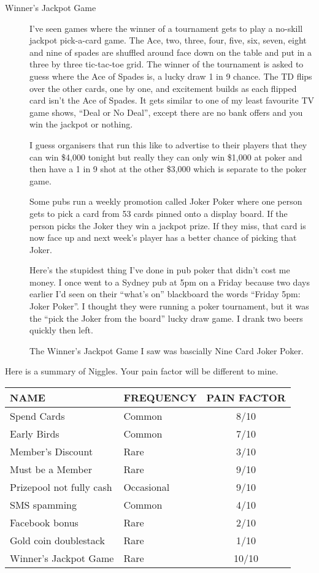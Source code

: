 \begin{description}
\item[Winner's Jackpot Game] I've seen games where the winner of a
tournament gets to play a no-skill jackpot pick-a-card game. The Ace, two,
three, four, five, six, seven, eight and nine of spades are shuffled
around face down on the table and put in a three by three tic-tac-toe
grid. The winner of the tournament is asked to guess where the Ace of
Spades is, a lucky draw 1 in 9 chance. The TD flips over the other
cards, one by one, and excitement builds as each flipped card isn't
the Ace of Spades. It gets similar to one of my least favourite TV
game shows, ``Deal or No Deal'', except there are no bank offers and you
win the jackpot or nothing.

I guess organisers that run this like to advertise to their players that
they can win \$4,000 tonight but really they can only win \$1,000 at
poker and then have a 1 in 9 shot at the other \$3,000 which is
separate to the poker game.

Some pubs run a weekly promotion called Joker Poker where one person
gets to pick a card from 53 cards pinned onto a display board. If the
person picks the Joker they win a jackpot prize. If they miss, that
card is now face up and next week's player has a better chance of
picking that Joker.

Here's the stupidest thing I've done in pub poker that didn't cost me
money. I once went to a Sydney pub at 5pm on a Friday because two days
earlier I'd seen on their ``what's on'' blackboard the words ``Friday
5pm: Joker Poker''. I thought they were running a poker tournament,
but it was the ``pick the Joker from the board'' lucky draw game.
I drank two beers quickly then left.

The Winner's Jackpot Game I saw was bascially Nine Card Joker Poker.

\end{description}

Here is a summary of Niggles. Your pain factor will be different to
mine.

\begin{tabular}{|l|l|c|} \hline
NAME                     &  FREQUENCY  & PAIN FACTOR\\ \hline
Spend Cards              & Common      & 8/10       \\ \hline
Early Birds              & Common      & 7/10       \\ \hline
Member's Discount        & Rare        & 3/10       \\ \hline
Must be a Member         & Rare        & 9/10       \\ \hline
Prizepool not fully cash & Occasional  & 9/10       \\ \hline
SMS spamming             & Common      & 4/10       \\ \hline
Facebook bonus           & Rare        & 2/10       \\ \hline
Gold coin doublestack    & Rare        & 1/10       \\ \hline
Winner's Jackpot Game    & Rare        & 10/10      \\ \hline
\end{tabular}

